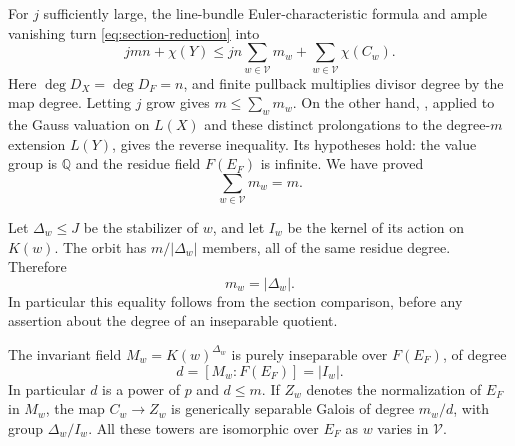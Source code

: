 For $j$ sufficiently large, the line-bundle Euler-characteristic formula
and ample vanishing turn \eqref{eq:section-reduction} into
\begin{equation}\label{eq:full-section-comparison}
 jmn+\chi(Y)
 \leq jn\sum_{w\in\mathcal V}m_w
       +\sum_{w\in\mathcal V}\chi(C_w).
\end{equation}
Here $\deg D_X=\deg D_F=n$, and finite pullback multiplies divisor
degree by the map degree. Letting $j$ grow gives
$m\leq\sum_wm_w$. On the other hand,
, applied to the Gauss valuation on
$L(X)$ and these distinct prolongations to the degree-$m$ extension
$L(Y)$, gives the reverse inequality. Its hypotheses hold: the value
group is $\mathbb Q$ and the residue field $F(E_F)$ is infinite.
We have proved
\begin{equation}\label{eq:residue-degree-equality}
 \sum_{w\in\mathcal V}m_w=m.
\end{equation}

Let $\Delta_w\leq J$ be the stabilizer of $w$, and let $I_w$ be the
kernel of its action on $K(w)$. The orbit has $m/|\Delta_w|$ members,
all of the same residue degree. Therefore
\begin{equation}\label{eq:decomposition-residue-degree}
 m_w=|\Delta_w|.
\end{equation}
In particular this equality follows from the section comparison, before
any assertion about the degree of an inseparable quotient.

\begin{lemma}\label{lem:inseparable-residue-quotient}
The invariant field $M_w=K(w)^{\Delta_w}$ is purely inseparable over
$F(E_F)$, of degree
\begin{equation}\label{eq:inertia-inseparable-degree}
 d=[M_w:F(E_F)]=|I_w|.
\end{equation}
In particular $d$ is a power of $p$ and $d\leq m$. If $Z_w$ denotes the
normalization of $E_F$ in $M_w$, the map $C_w\to Z_w$ is generically
separable Galois of degree $m_w/d$, with group $\Delta_w/I_w$.
All these towers are isomorphic over $E_F$ as $w$ varies in $\mathcal V$.
\end{lemma}

